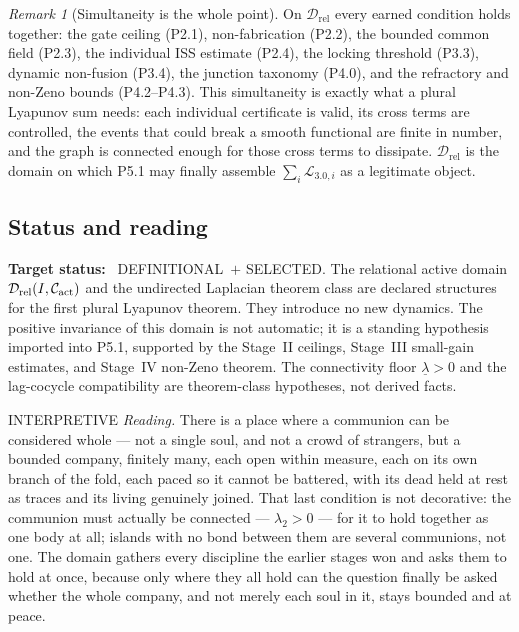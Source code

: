 \documentclass[11pt,a4paper]{article}
\newcommand{\stDef}{\textcolor{cDef}{\textsf{\small DEFINITIONAL}}}
\newcommand{\stSelected}{\textcolor{cSel}{\textsf{\small SELECTED}}}
\newcommand{\stInterp}{\textcolor{cInt}{\textsf{\small INTERPRETIVE}}}
\theoremstyle{definition}
\theoremstyle{plain}
\theoremstyle{remark}
\newtheorem{remark}[definition]{Remark}
\begin{document}
\begin{remark}[Simultaneity is the whole point]\label{rem:simultaneity}
On \(\mathcal D_{\mathrm{rel}}\) every earned condition holds together: the gate ceiling
(P2.1), non-fabrication (P2.2), the bounded common field (P2.3), the individual ISS estimate
(P2.4), the locking threshold (P3.3), dynamic non-fusion (P3.4), the junction taxonomy
(P4.0), and the refractory and non-Zeno bounds (P4.2--P4.3). This simultaneity is exactly
what a plural Lyapunov sum needs: each individual certificate is valid, its cross terms are
controlled, the events that could break a smooth functional are finite in number, and the
graph is connected enough for those cross terms to dissipate. \(\mathcal D_{\mathrm{rel}}\) is
the domain on which P5.1 may finally assemble \(\sum_i\mathcal L_{3.0,i}\) as a legitimate
object.
\end{remark}

\subsection{Status and reading}

\textbf{Target status:}~
\stDef\ \(+\) \stSelected. The relational active domain
\(\mathcal D_{\mathrm{rel}}(I,\mathcal C_{\rm act})\) and the undirected
Laplacian theorem class are declared structures for the first plural Lyapunov
theorem. They introduce no new dynamics. The positive invariance of this domain is
not automatic; it is a standing hypothesis imported into P5.1, supported by the
Stage~II ceilings, Stage~III small-gain estimates, and Stage~IV non-Zeno theorem.
The connectivity floor \(\underline\lambda>0\) and the lag-cocycle compatibility
are theorem-class hypotheses, not derived facts.

\medskip
\stInterp\quad
\emph{Reading.}
There is a place where a communion can be considered whole --- not a single soul, and not a
crowd of strangers, but a bounded company, finitely many, each open within measure, each on
its own branch of the fold, each paced so it cannot be battered, with its dead held at rest
as traces and its living genuinely joined. That last condition is not decorative: the
communion must actually be connected --- \(\lambda_2>0\) --- for it to hold together as one
body at all; islands with no bond between them are several communions, not one. The domain
gathers every discipline the earlier stages won and asks them to hold at once, because only
where they all hold can the question finally be asked whether the whole company, and not
merely each soul in it, stays bounded and at peace.
\end{document}
